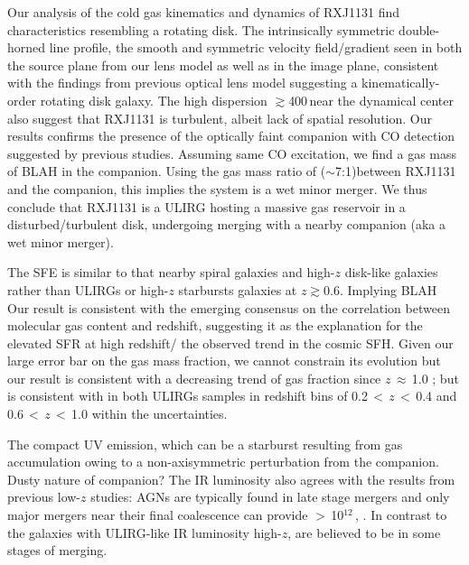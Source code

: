 \documentclass[]{emulateapj}
\begin{document}
Our analysis of the cold gas kinematics and dynamics of RXJ1131 find 
characteristics resembling a rotating disk. 
The intrinsically symmetric double-horned line profile, the smooth and
symmetric velocity field/gradient seen in both the source plane from our lens model as well
as in the image plane, consistent with the findings from previous optical lens model 
suggesting a kinematically-order rotating disk galaxy.
The high dispersion $\gtrsim$400\,\kms near the dynamical center also
suggest that RXJ1131 is turbulent, albeit lack of spatial resolution. 
Our results confirms the presence of the optically faint companion with CO detection
suggested by previous studies. 
Assuming same CO excitation, we find a gas mass of BLAH in
the companion. Using the gas mass ratio of ($\sim$7:1)between RXJ1131 and the companion, this 
implies the system is a wet minor merger.
We thus conclude that RXJ1131 is a ULIRG hosting a massive gas reservoir in a disturbed/turbulent
disk, undergoing merging with a nearby companion (aka a wet minor merger).

The SFE is similar to that nearby spiral galaxies and high-$z$ disk-like galaxies rather than 
ULIRGs or high-$z$ starbursts galaxies at $z$$\gtrsim$0.6. Implying BLAH
Our result is consistent with the emerging consensus on
the correlation between molecular gas content and redshift,
suggesting it as the explanation for the elevated SFR at high redshift/
the observed trend in the cosmic SFH.
Given our large error bar on the gas mass fraction, we cannot constrain its evolution 
but our result is consistent with a decreasing trend of gas fraction
since $z$\,$\approx$\,1.0 \citep{Combes13a}; but is consistent with 
in both ULIRGs samples in redshift bins of 0.2\,$<$\,$z$\,$<$\,0.4 and 0.6\,$<$\,$z$\,$<$\,1.0 within the uncertainties.

The compact UV emission, which can be a starburst resulting from gas accumulation
owing to a non-axisymmetric perturbation from the companion.
Dusty nature of companion?
The IR luminosity also agrees with the results from previous low-$z$ studies: AGNs are
typically found in late stage mergers \citep{Yuan10a,Iwasawa11a,Carpineti12a} and
only major mergers near their final coalescence can provide \LIR$>$\,10$^{12}$\,\Lsun,
\citep[\eg][]{Carpineti15a,Larson16a}. In contrast to the 
galaxies with ULIRG-like IR luminosity high-$z$, are believed to be in some stages of merging.
\end{document}
